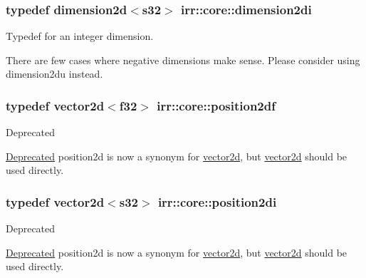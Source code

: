 \subsubsection[{\texorpdfstring{dimension2di}{dimension2di}}]{\setlength{\rightskip}{0pt plus 5cm}typedef {\bf dimension2d}$<${\bf s32}$>$ {\bf irr\+::core\+::dimension2di}}\hypertarget{namespaceirr_1_1core_ac79bc3704cf28bc1ab72d7cd1cae78d1}{}\label{namespaceirr_1_1core_ac79bc3704cf28bc1ab72d7cd1cae78d1}


Typedef for an integer dimension. 

There are few cases where negative dimensions make sense. Please consider using dimension2du instead. 
\subsubsection[{\texorpdfstring{position2df}{position2df}}]{\setlength{\rightskip}{0pt plus 5cm}typedef {\bf vector2d}$<${\bf f32}$>$ {\bf irr\+::core\+::position2df}}\hypertarget{namespaceirr_1_1core_ad9a4cf4ed6b9e8763ffd6656121fd32e}{}\label{namespaceirr_1_1core_ad9a4cf4ed6b9e8763ffd6656121fd32e}
\begin{DoxyRefDesc}{Deprecated}
\item[\hyperlink{deprecated__deprecated000008}{Deprecated}]position2d is now a synonym for \hyperlink{classirr_1_1core_1_1vector2d}{vector2d}, but \hyperlink{classirr_1_1core_1_1vector2d}{vector2d} should be used directly. \end{DoxyRefDesc}
\subsubsection[{\texorpdfstring{position2di}{position2di}}]{\setlength{\rightskip}{0pt plus 5cm}typedef {\bf vector2d}$<${\bf s32}$>$ {\bf irr\+::core\+::position2di}}\hypertarget{namespaceirr_1_1core_a3643c2cc7820dd78cd87e73a46b92145}{}\label{namespaceirr_1_1core_a3643c2cc7820dd78cd87e73a46b92145}
\begin{DoxyRefDesc}{Deprecated}
\item[\hyperlink{deprecated__deprecated000009}{Deprecated}]position2d is now a synonym for \hyperlink{classirr_1_1core_1_1vector2d}{vector2d}, but \hyperlink{classirr_1_1core_1_1vector2d}{vector2d} should be used directly. \end{DoxyRefDesc}


